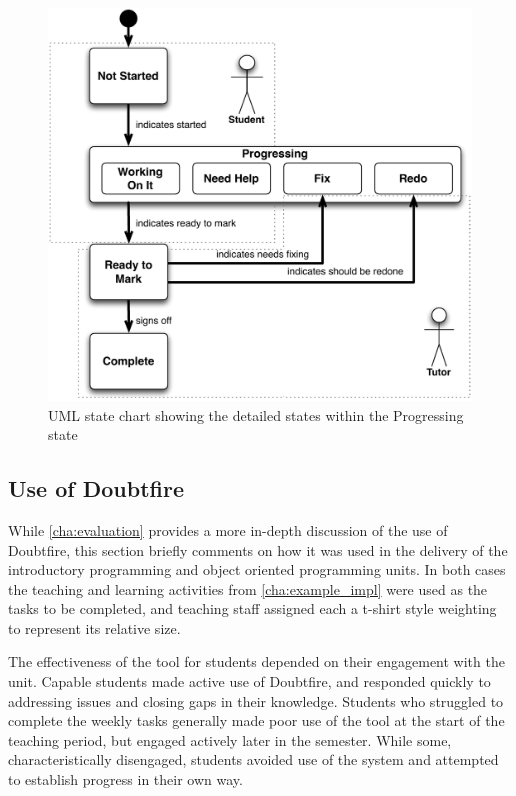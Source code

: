 \begin{figure}[thbp]
  \centering
  \includegraphics[width=\textwidth]{DetailedStepsInProgress}
  \caption{UML state chart showing the detailed states within the Progressing state}
  \label{fig:detailed_states}
\end{figure}


\subsection{Use of Doubtfire} %
\label{sub:use_of_doubtfire}

While \cref{cha:evaluation} provides a more in-depth discussion of the use of Doubtfire, this section briefly comments on how it was used in the delivery of the introductory programming and object oriented programming units. In both cases the teaching and learning activities from \cref{cha:example_impl} were used as the tasks to be completed, and teaching staff assigned each a t-shirt style weighting to represent its relative size.

The effectiveness of the tool for students depended on their engagement with the unit. Capable students made active use of Doubtfire, and responded quickly to addressing issues and closing gaps in their knowledge. Students who struggled to complete the weekly tasks generally made poor use of the tool at the start of the teaching period, but engaged actively later in the semester. While some, characteristically disengaged, students avoided use of the system and attempted to establish progress in their own way.

